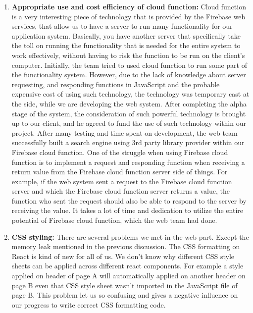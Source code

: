 \documentclass[onecolumn, draftclsnofoot,10pt, compsoc]{IEEEtran}
\begin{document}
\begin{flushleft}
\begin{enumerate}
  \item \textbf{Appropriate use and cost efficiency of cloud function: } \newline
  Cloud function is a very interesting piece of technology that is provided by the Firebase web services, that allow us to have a server to run many functionality for our application system. Basically, you have another server that specifically take the toll on running the functionality that is needed for the entire system to work effectively, without having to risk the function to be run on the client's computer. Initially, the team tried to used cloud function to run some part of the functionality system. However, due to the lack of knowledge about server requesting, and responding functions in JavaScript and the probable expensive cost of using such technology, the technology was temporary cast at the side, while we are developing the web system. After completing the alpha stage of the system, the consideration of such powerful technology is brought up to our client, and he agreed to fund the use of such technology within our project. After many testing and time spent on development, the web team successfully built a search engine using 3rd party library provider within our Firebase cloud function. One of the struggle when using Firebase cloud function is to implement a request and responding function when receiving a return value from the Firebase cloud function server side of things. For example, if the web system sent a request to the Firebase cloud function server and which the Firebase cloud function server returns a value, the function who sent the request should also be able to respond to the server by receiving the value. It takes a lot of time and dedication to utilize the entire potential of Firebase cloud function, which the web team had done. \newline
 
 
 \item \textbf{CSS styling:}\newline
 There are several problems we met in the web part. Except the memory leak mentioned in the previous discussion. The CSS formatting on React is kind of new for all of us. We don't know why different CSS style sheets can be applied across different react components. For example a style applied on header of page A will automatically applied on another header on page B even that CSS style sheet wasn't imported in the JavaScript file of page B. This problem let us so confusing and gives a negative influence on our progress to write correct CSS formatting code.\newline  
\end{enumerate}

\end{flushleft}
\end{document}
